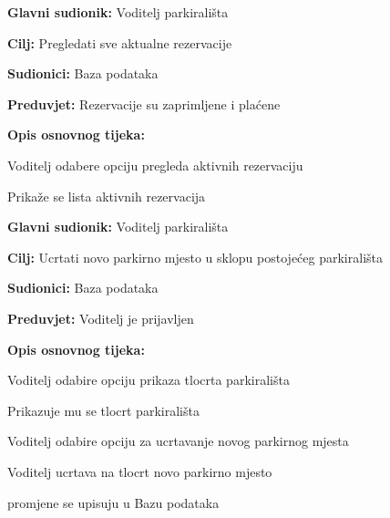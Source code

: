                         \noindent {}
					\begin{packed_item}
	
						\item \textbf{Glavni sudionik: }Voditelj parkirališta
						\item  \textbf{Cilj:} Pregledati sve aktualne rezervacije
						\item  \textbf{Sudionici:} Baza podataka
						\item  \textbf{Preduvjet:} Rezervacije su zaprimljene i plaćene
						\item  \textbf{Opis osnovnog tijeka:}
						
						\item[] \begin{packed_enum}
	
							\item Voditelj odabere opciju pregleda aktivnih rezervaciju
							\item Prikaže se lista aktivnih rezervacija
						
						\end{packed_enum}
					\end{packed_item}

                        \noindent {}
					\begin{packed_item}
	
						\item \textbf{Glavni sudionik: }Voditelj parkirališta
						\item  \textbf{Cilj:} Ucrtati novo parkirno mjesto u sklopu postojećeg parkirališta
						\item  \textbf{Sudionici:} Baza podataka
						\item  \textbf{Preduvjet:} Voditelj je prijavljen
						\item  \textbf{Opis osnovnog tijeka:}
						
						\item[] \begin{packed_enum}
	
							\item Voditelj odabire opciju prikaza tlocrta parkirališta
							\item Prikazuje mu se tlocrt parkirališta
							\item Voditelj odabire opciju za ucrtavanje novog parkirnog mjesta
                                \item Voditelj ucrtava na tlocrt novo parkirno mjesto
                                \item promjene se upisuju u Bazu podataka
							
						\end{packed_enum}
					\end{packed_item}


